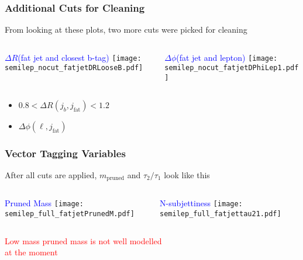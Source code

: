\documentclass{beamer}
\begin{document}
\begin{frame}
  \frametitle{Additional Cuts for Cleaning}
  From looking at these plots, two more cuts were picked for cleaning
  \begin{columns}
    \begin{column}{0.5\linewidth}
      \centering
      \textcolor{blue}{$\Delta R$(fat jet and closest b-tag)}
      \texttt{[image: semilep\_nocut\_fatjetDRLooseB.pdf]}
    \end{column}
    \begin{column}{0.5\linewidth}
      \centering
      \textcolor{blue}{$\Delta \phi$(fat jet and lepton)}
      \texttt{[image: semilep\_nocut\_fatjetDPhiLep1.pdf]}
    \end{column}
  \end{columns}
  \begin{itemize}
  \item $0.8 < \Delta R(j_b,j_\text{fat}) < 1.2$ 
  \item $\Delta\phi(\ell,j_\text{fat})$
  \end{itemize}
\end{frame}

\begin{frame}
  \frametitle{Vector Tagging Variables}
  After all cuts are applied, $m_\text{pruned}$ and $\tau_2/\tau_1$ look like this
  \vspace{10pt}
  \begin{columns}
    \begin{column}{0.5\linewidth}
      \centering
      \textcolor{blue}{Pruned Mass}
      \texttt{[image: semilep\_full\_fatjetPrunedM.pdf]}
    \end{column}
    \begin{column}{0.5\linewidth}
      \centering
      \textcolor{blue}{N-subjettiness}
      \texttt{[image: semilep\_full\_fatjettau21.pdf]}
    \end{column}
  \end{columns}
  \vspace{10pt}
  \textcolor{red}{Low mass pruned mass is not well modelled \\ at the moment}
\end{frame}
\end{document}

